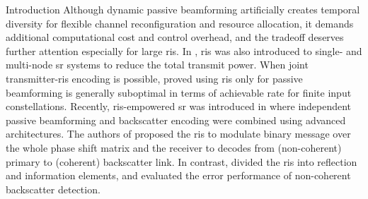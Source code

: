 \documentclass[journal]{IEEEtran}
\begin{document}
\begin{section}{Introduction}
	Although dynamic passive beamforming artificially creates temporal diversity for flexible channel reconfiguration and resource allocation, it demands additional computational cost and control overhead, and the tradeoff deserves further attention especially for large \gls{ris}.
	In \cite{Chen2021,Zhang2021d}, \gls{ris} was also introduced to single- and multi-node \gls{sr} systems to reduce the total transmit power.
	When joint transmitter-\gls{ris} encoding is possible, \cite{Karasik2019} proved using \gls{ris} only for passive beamforming is generally suboptimal in terms of achievable rate for finite input constellations.
	Recently, \gls{ris}-empowered \gls{sr} was introduced in \cite{Xu2020b,Hua2022,Hu2021a} where independent passive beamforming and backscatter encoding were combined using advanced architectures.
	The authors of \cite{Xu2020b,Hua2022} proposed the \gls{ris} to modulate binary message over the whole phase shift matrix and the receiver to decodes from (non-coherent) primary to (coherent) backscatter link.
	In contrast, \cite{Hu2021a} divided the \gls{ris} into reflection and information elements, and evaluated the error performance of non-coherent backscatter detection.


\end{section}
\end{document}
